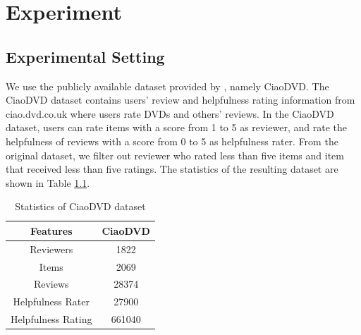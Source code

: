 \documentclass[master,english,final]{kaist-ucs}
\begin{document}

\chapter{Experiment}
\section{Experimental Setting}
We use the publicly available dataset provided by \cite{ETAF}, namely CiaoDVD.
The CiaoDVD dataset contains users’ review and helpfulness rating information from ciao.dvd.co.uk where users rate DVDs and others’ reviews.
In the CiaoDVD dataset, users can rate items with a score from 1 to 5 as reviewer, and rate the helpfulness of reviews with a score from 0 to 5 as helpfulness rater.
From the original dataset, we filter out reviewer who rated less than five items and item that received less than five ratings.
The statistics of the resulting dataset are shown in Table \ref{tableCiaoDVD}.

\begin{table}[h]
\caption{Statistics of CiaoDVD dataset}
\label{tableCiaoDVD}
\begin{center}
\begin{tabular} {|c|c|}
\hline
\textbf{Features} & \textbf{CiaoDVD} \\ \hline
Reviewers & 1822 \\ \hline
Items & 2069 \\ \hline
Reviews & 28374 \\ \hline
Helpfulness Rater & 27900 \\ \hline
Helpfulness Rating & 661040 \\ \hline
\end{tabular}
\end{center}
\end{table}
\end{document}
